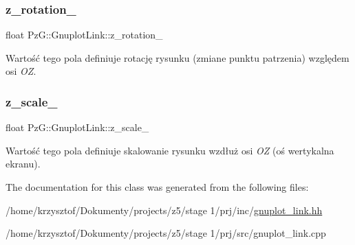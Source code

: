\subsubsection{\texorpdfstring{z\+\_\+rotation\+\_\+}{z\_rotation\_}}
{\footnotesize\ttfamily float Pz\+G\+::\+Gnuplot\+Link\+::z\+\_\+rotation\+\_\+\hspace{0.3cm}{\ttfamily [protected]}}

Wartość tego pola definiuje rotację rysunku (zmiane punktu patrzenia) względem osi {\itshape OZ}. \mbox{\label{class_pz_g_1_1_gnuplot_link_a9926edcec6c7080a35f62c050f2773dc}} 
\subsubsection{\texorpdfstring{z\+\_\+scale\+\_\+}{z\_scale\_}}
{\footnotesize\ttfamily float Pz\+G\+::\+Gnuplot\+Link\+::z\+\_\+scale\+\_\+\hspace{0.3cm}{\ttfamily [protected]}}

Wartość tego pola definiuje skalowanie rysunku wzdłuż osi {\itshape OZ} (oś wertykalna ekranu). 

The documentation for this class was generated from the following files\+:\begin{DoxyCompactItemize}
\item 
/home/krzysztof/\+Dokumenty/projects/z5/stage 1/prj/inc/\hyperlink{gnuplot__link_8hh}{gnuplot\+\_\+link.\+hh}\item 
/home/krzysztof/\+Dokumenty/projects/z5/stage 1/prj/src/gnuplot\+\_\+link.\+cpp\end{DoxyCompactItemize}
